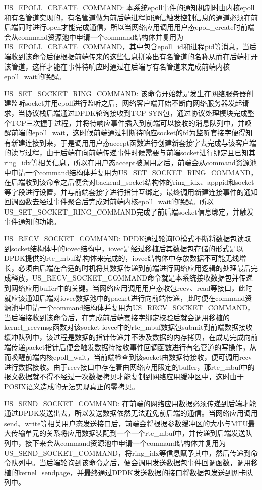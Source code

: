 US\_EPOLL\_CREATE\_COMMAND: 本系统epoll事件的通知机制时由内核epoll和有名管道实现的，有名管道做为前后端进程间通信触发控制信息的通道必须在前后端同时进行open才能完成通信，所以当网络应用调用用户态epoll\_create时前端会从command资源池中申请一个command结构体并复用为US\_EPOLL\_CREATE\_COMMAND，其中包含epoll\_id和进程pid等消息，当后端收到该命令后便根据前端传来的这些信息拼凑出有名管道的名称从而在后端打开该管道，这样才能在事件待响应时通过在后端写有名管道来完成前端内核epoll\_wait的唤醒。

US\_SET\_SOCKET\_RING\_COMMAND: 该命令开始就是发生在网络服务器创建监听socket并用epoll进行监听之后，网络客户端开始不断向网络服务器发起请求，当协议栈后端通过DPDK轮询接收到TCP SYN包，通过协议处理模块完成整个TCP三次握手过程，并将待响应事件插入到前端可以接收的消息队列中，并唤醒前端的epoll\_wait，这时候前端通过判断待响应socket的fd为监听套接字便得知有新建连接到来，于是调用用户态accept函数进行创建新套接字去完成与该客户端的读写过程，由于后端在向前端传递事件时候需要与前端socket进行绑定且已知其ring\_idx等相关信息，所以在用户态accept被调用之后，前端会从command资源池中申请一个command结构体并复用为US\_SET\_SOCKET\_RING\_COMMAND，在后端收到该命令之后便会对backend\_socket结构体的ring\_idx、apppid和socket等字段进行设置，并与前端套接字进行指针互绑定，最终调用新建连接事件的通知回调函数去经过事件聚合后完成对前端内核epoll\_wait的唤醒。所以US\_SET\_SOCKET\_RING\_COMMAND完成了前后端socket信息绑定，并触发事件通知的功能。

US\_RECV\_SOCKET\_COMMAND: DPDK通过轮询IO模式不断将数据包读取到socket结构体中的iovec结构中，iovec是经过移植后其数据包存储的形式是以DPDK提供的rte\_mbuf结构体来完成的，iovec结构体中存放数据不可能无线增长，必须由后端在合适的时机将其数据传递到前端进行网络应用逻辑的处理最后完成释放，US\_RECV\_SOCKET\_COMMAND命令就是本系统接收数据包并传递到网络应用buffer中的关键。当网络应用调用用户态收包recv、read等接口，此时就应该通知后端对iovec数据池中的packet进行向前端传递，此时便在command资源池中申请一个command结构体并复用为US\_RECV\_SOCKET\_COMMAND，当后端接收到该命令后，在完成前后端套接字绑定校验后就会调用移植的kernel\_recvmsg函数对该socket iovec中的rte\_mbuf数据包submit到前端数据接收缓冲队列中，该过程是数据的指针传递并不涉及数据的内存拷贝，在成功完成向前端传递packet指针后便会触发数据待接收事件回调函数进行有名管道的写操作，从而唤醒前端内核epoll\_wait，当前端检查到该socket由数据待接收，便可调用recv进行数据接收。由于recv接口中存在着由网络应用限定的buffer，那rte\_mbuf中的报文数据就不得不经过一次数据拷贝才能复制到网络应用缓冲区中，这时由于POSIX语义造成的无法实现真正的零拷贝。


US\_SEND\_SOCKET\_COMMAND: 在前端的网络应用数据必须传递到后端才能通过DPDK发送出去，所以发送数据依然无法避免前后端的通信。当网络应用调用send、write等相关用户态发送接口后，前端会将根据参数缓冲区的大小与MTU最大传输单元的关系将应用数据装配到一个一个rte\_mbuf中，并传递到后端发送队列中，接下来会从command资源池中申请一个command结构体并复用为US\_SEND\_SOCKET\_COMMAND，将ring\_idx等信息赋予其中，然后传递到命令队列中。当后端轮询到该命令之后，便会调用发送数据包事件回调函数，调用移植的kernel\_sendpage，并最终通过DPDK发送数据的接口将数据包发送到网卡队列中。

